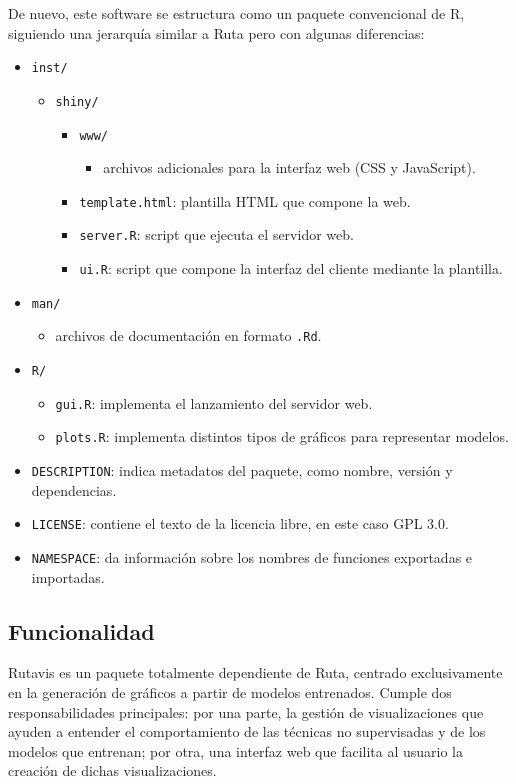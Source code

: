 De nuevo, este software se estructura como un paquete convencional de R, siguiendo una jerarquía similar a Ruta pero con algunas diferencias:
\begin{itemize}
\item \texttt{inst/}
  \begin{itemize}
  \item \texttt{shiny/}
  \begin{itemize}
  \item \texttt{www/}
  \begin{itemize}
  \item archivos adicionales para la interfaz web (CSS y JavaScript).
  \end{itemize}
  \item \texttt{template.html}: plantilla HTML que compone la web.
  \item \texttt{server.R}: script que ejecuta el servidor web.
  \item \texttt{ui.R}: script que compone la interfaz del cliente mediante la plantilla.
  \end{itemize}
  \end{itemize}
\item \texttt{man/}
  \begin{itemize}
  \item archivos de documentación en formato \texttt{.Rd}.
  \end{itemize}
\item \texttt{R/}
  \begin{itemize}
  \item \texttt{gui.R}: implementa el lanzamiento del servidor web.
  \item \texttt{plots.R}: implementa distintos tipos de gráficos para representar modelos.
  \end{itemize}
\item \texttt{DESCRIPTION}: indica metadatos del paquete, como nombre, versión y dependencias.
\item \texttt{LICENSE}: contiene el texto de la licencia libre, en este caso GPL 3.0.
\item \texttt{NAMESPACE}: da información sobre los nombres de funciones exportadas e importadas.
\end{itemize}

\subsection{Funcionalidad}

Rutavis es un paquete totalmente dependiente de Ruta, centrado exclusivamente en la generación de gráficos a partir de modelos entrenados. Cumple dos responsabilidades principales: por una parte, la gestión de visualizaciones que ayuden a entender el comportamiento de las técnicas no supervisadas y de los modelos que entrenan; por otra, una interfaz web que facilita al usuario la creación de dichas visualizaciones.

